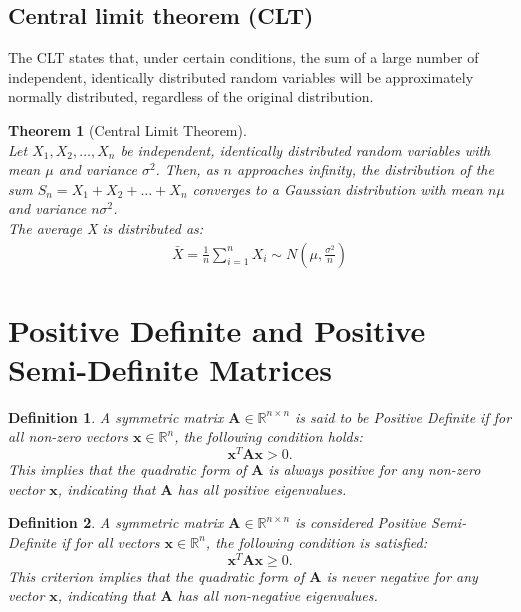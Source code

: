 \documentclass[11pt]{book} %
\newtheorem{theorem}{Theorem}[section]
\newtheorem{definition}{Definition}[section]
\begin{document}
\subsection{Central limit theorem (CLT)}

The CLT states that, under certain conditions, the sum of a large number of independent, identically distributed random variables will be approximately normally distributed, 
regardless of the original distribution.
\begin{theorem}[Central Limit Theorem]\ \\
    Let \(X_1, X_2, \ldots, X_n\) be independent, identically distributed random variables with mean \(\mu\) and variance \(\sigma^2\). 
    Then, as \(n\) approaches infinity, the distribution of the sum \(S_n = X_1 + X_2 + \ldots + X_n\) converges to a 
    Gaussian distribution with mean \(n\mu\) and variance \(n\sigma^2\). \\
    The average X is distributed as:
    \begin{align*}
        \bar{X} = \frac{1}{n} \sum_{i=1}^{n} X_i \sim N(\mu, \frac{\sigma^2}{n})
    \end{align*}
\end{theorem}





\section{Positive Definite and Positive Semi-Definite Matrices}


\begin{definition}
A symmetric matrix \(\mathbf{A} \in \mathbb{R}^{n \times n}\) is said to be \textit{Positive Definite} if for all non-zero vectors \(\mathbf{x} \in \mathbb{R}^n\), the following condition holds:
\begin{equation}
\mathbf{x}^T \mathbf{A} \mathbf{x} > 0.
\end{equation}
This implies that the quadratic form of \(\mathbf{A}\) is always positive for any non-zero vector \(\mathbf{x}\), indicating that \(\mathbf{A}\) has all positive eigenvalues.
\end{definition}

\begin{definition}
A symmetric matrix \(\mathbf{A} \in \mathbb{R}^{n \times n}\) is considered \textit{Positive Semi-Definite} if for all vectors \(\mathbf{x} \in \mathbb{R}^n\), the following condition is satisfied:
\begin{equation}
\mathbf{x}^T \mathbf{A} \mathbf{x} \geq 0.
\end{equation}
This criterion implies that the quadratic form of \(\mathbf{A}\) is never negative for any vector \(\mathbf{x}\), indicating that \(\mathbf{A}\) has all non-negative eigenvalues.
\end{definition}
\end{document}
